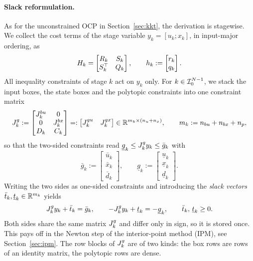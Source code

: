 \paragraph{Slack reformulation.}
As for the unconstrained OCP in Section~\ref{sec:kkt}, the derivation is stagewise.
We collect the cost terms of the stage variable $y_k = [u_k; x_k]$, in input-major ordering, as
\[
    H_k = \begin{bmatrix} R_k & S_k \\ S_k^\top & Q_k \end{bmatrix},
    \qquad
    h_k := \begin{bmatrix} r_k \\ q_k \end{bmatrix}.
\]
All inequality constraints of stage $k$ act on $y_k$ only.
For $k\in\mathcal{I}_{0}^{N-1}$, we stack the input boxes, the state boxes and the polytopic constraints into one constraint matrix
\[
    {J^{g}_{k}} :=
    \begin{bmatrix}
        J_k^{bu} & 0        \\
        0        & J_k^{bx} \\
        D_k      & C_k
    \end{bmatrix}
    =: \begin{bmatrix} {J^{gu}_{k}} & {J^{gx}_{k}} \end{bmatrix}
    \in \mathbb{R}^{m_k \times (n_u + n_x)},
    \qquad
    m_k := n_{bu} + n_{bx} + n_p ,
\]
so that the two-sided constraints read $\underline{g}_k \leq {J^{g}_{k}} y_k \leq \bar{g}_k$ with
\[
    \bar{g}_k := \begin{bmatrix} \bar{u}_k \\ \bar{x}_k \\ \bar{d}_k \end{bmatrix},
    \qquad
    \underline{g}_k := \begin{bmatrix} \underline{u}_k \\ \underline{x}_k \\ \underline{d}_k \end{bmatrix}.
\]
Writing the two sides as one-sided constraints and introducing the \textit{slack vectors} $\bar{t}_k, \underline{t}_k \in \mathbb{R}^{m_k}$ yields
\[
    {J^{g}_{k}} y_k + \bar{t}_k = \bar{g}_k,
    \qquad
    -{J^{g}_{k}} y_k + \underline{t}_k = -\underline{g}_k,
    \qquad
    \bar{t}_k,\, \underline{t}_k \geq 0 .
\]
Both sides share the same matrix ${J^{g}_{k}}$ and differ only in sign, so it is stored once.
This pays off in the Newton step of the interior-point method (IPM), see Section~\ref{sec:ipm}.
The row blocks of ${J^{g}_{k}}$ are of two kinds: the box rows are rows of an identity matrix, the polytopic rows are dense.
